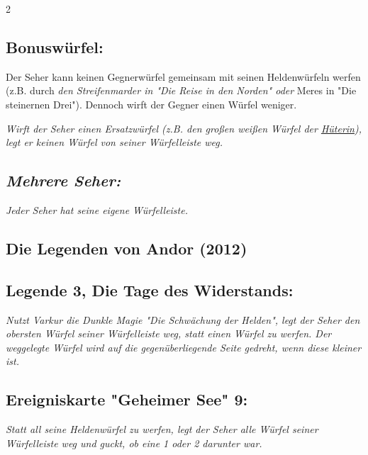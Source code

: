 \documentclass[10pt, a4paper, oneside]{book}
\newcommand{\fan}[1]{\textit{#1}}
\begin{document}
\begin{multicols*}{2}
\begin{nobgcolor}
\columnbreak


\subsection{Bonuswürfel:}

Der Seher kann keinen Gegnerwürfel gemeinsam mit seinen Heldenwürfeln werfen (z.B. durch \fan{den Streifenmarder in "Die Reise in den Norden" oder} Meres in "Die steinernen Drei"\supercite{AG:Begleitheft}). Dennoch wirft der Gegner einen Würfel weniger.

\fan{Wirft der Seher einen Ersatzwürfel (z.B. den großen weißen Würfel der \hyperref[Hüterin]{Hüterin}), legt er keinen Würfel von seiner Würfelleiste weg.}
\supercite{49630}






\subsection{\fan{Mehrere Seher:}}

\fan{Jeder Seher hat seine eigene Würfelleiste.}




\end{nobgcolor}



\begin{bgcolor}
\section{Die Legenden von Andor (2012)}


\subsection{Legende 3, Die Tage des Widerstands:}

\fan{Nutzt Varkur die Dunkle Magie "Die Schwächung der Helden", legt der Seher den obersten Würfel seiner Würfelleiste weg, statt einen Würfel zu werfen. Der weggelegte Würfel wird auf die gegenüberliegende Seite gedreht, wenn diese kleiner ist.}



\subsection{Ereigniskarte "Geheimer See" 9:}

\fan{Statt all seine Heldenwürfel zu werfen, legt der Seher alle Würfel seiner Würfelleiste weg und guckt, ob eine 1 oder 2 darunter war.}



\end{bgcolor}
\end{multicols*}
\end{document}
